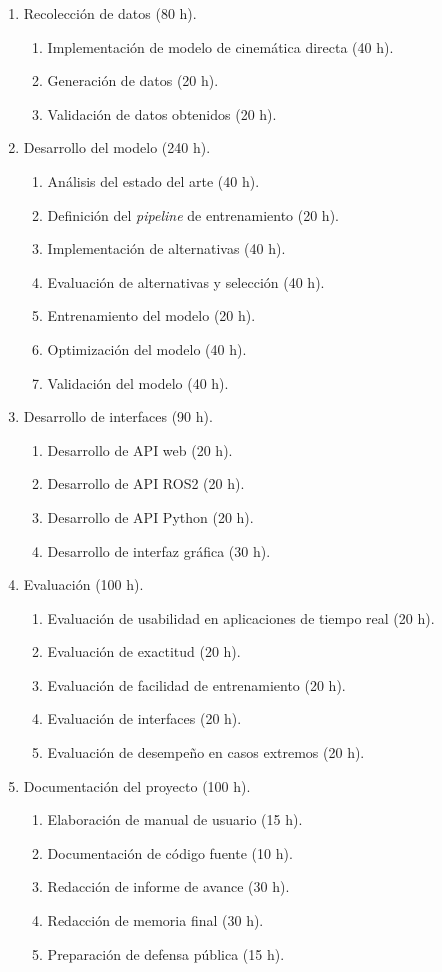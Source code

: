 \documentclass[
11pt, %
]{charter}
\begin{document}
\begin{enumerate}
\item Recolección de datos (80 h).
	\begin{enumerate}
	\item Implementación de modelo de cinemática directa (40 h).
	\item Generación de datos (20 h).
	\item Validación de datos obtenidos (20 h).
	\end{enumerate}
	
\item Desarrollo del modelo (240 h).
	\begin{enumerate}
	\item Análisis del estado del arte (40 h).
	\item Definición del \textit{pipeline} de entrenamiento (20 h).
	\item Implementación de alternativas (40 h).
	\item Evaluación de alternativas y selección (40 h).
	\item Entrenamiento del modelo (20 h).
	\item Optimización del modelo (40 h).
	\item Validación del modelo (40 h).
	\end{enumerate}
	
\item Desarrollo de interfaces (90 h).
	\begin{enumerate}
	\item Desarrollo de API web (20 h).
	\item Desarrollo de API ROS2 (20 h).
	\item Desarrollo de API Python (20 h).
	\item Desarrollo de interfaz gráfica (30 h).
	\end{enumerate}
	
\item Evaluación (100 h).
	\begin{enumerate}
	\item Evaluación de usabilidad en aplicaciones de tiempo real (20 h).
	\item Evaluación de exactitud (20 h).
	\item Evaluación de facilidad de entrenamiento (20 h).
	\item Evaluación de interfaces (20 h).
	\item Evaluación de desempeño en casos extremos (20 h).
	\end{enumerate}
	
\item Documentación del proyecto (100 h).
	\begin{enumerate}
	\item Elaboración de manual de usuario (15 h).
	\item Documentación de código fuente (10 h).
	\item Redacción de informe de avance (30 h).
	\item Redacción de memoria final (30 h).
	\item Preparación de defensa pública (15 h).
	\end{enumerate}
\end{enumerate}
\end{document}
